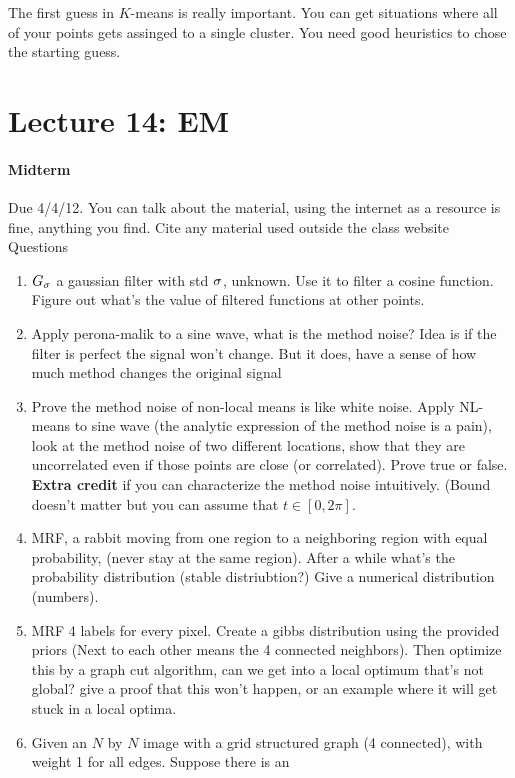 The first guess in $K$-means is really important. You can get
situations where all of your points gets assinged to a single
cluster. You need good heuristics to chose the starting guess. 

\pagebreak
\section{Lecture 14: EM}

\paragraph{Midterm} Due 4/4/12.
You can talk about the material, using the internet as a resource is
fine, anything you find. Cite any material used outside the class
website
Questions
\begin{enumerate}
\item $G_\sigma$ a gaussian filter with std $\sigma$, unknown. Use it to filter a
  cosine function. Figure out what's the value of filtered functions
  at other points.
\item Apply perona-malik to a sine wave, what is the method noise?
  Idea is if the filter is perfect the signal won't change. But it
  does, have a sense of how much method changes the original signal
\item Prove the method noise of non-local means is like white noise. Apply
  NL-means to sine wave (the analytic expression of the method noise
  is a pain), look at the method noise of two different locations, show
  that they are uncorrelated even if those points are close (or correlated). Prove
  true or false. \textbf{Extra credit} if you can characterize the method noise
  intuitively. (Bound doesn't matter but you can assume that $t\in [0, 2\pi]$.
\item MRF, a rabbit moving from one region to a neighboring region
  with equal probability, (never stay at the same region). After a
  while what's the probability distribution (stable distriubtion?)
  Give a numerical distribution (numbers).
\item MRF 4 labels for every pixel. Create a gibbs distribution using
  the provided priors (Next
  to each other means the 4 connected neighbors). Then optimize this
  by a graph cut algorithm, can we get into a local optimum that's not
  global? give a proof that this won't happen, or an example where it
  will get stuck in a local optima.
\item Given an $N$ by $N$ image with a grid structured graph (4
  connected), with weight 1 for all edges. Suppose there is an

\end{enumerate}
